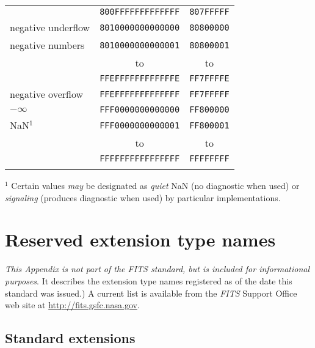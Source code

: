 \documentclass[onecolumn]{aa}
\begin{document}
\begin{table}
\begin{center}
\begin{tabular}{lcc}
                        & {\tt 800FFFFFFFFFFFFF} & {\tt 807FFFFF} \\
    negative underflow  & {\tt 8010000000000000} & {\tt 80800000} \\
    negative numbers    & {\tt 8010000000000001} & {\tt 80800001} \\
                        &             to         &         to     \\
                        & {\tt FFEFFFFFFFFFFFFE} & {\tt FF7FFFFE} \\
    negative overflow   & {\tt FFEFFFFFFFFFFFFF} & {\tt FF7FFFFF} \\
    $-\infty$           & {\tt FFF0000000000000} & {\tt FF800000} \\
    NaN$^{1}$           & {\tt FFF0000000000001} & {\tt FF800001} \\
                        &             to         &         to     \\
                        & {\tt FFFFFFFFFFFFFFFF} & {\tt FFFFFFFF} \\
                        &                                         \\ 
\hline
\end{tabular}
\end{center}
$^1$ Certain values {\em may} be designated as  {\em quiet} NaN (no diagnostic
when used)  or {\em signaling} (produces diagnostic when used) by
particular implementations. 

\label{t:ieee}
\end{table}
 

\ifonecol
\else
\twocolumn
\fi


\section{Reserved extension type names}
\label{s:resname}   
{\em This Appendix is not part of the {\em FITS\/} standard, 
but  is included for
informational purposes}.  It describes the
extension type names registered as of the date this standard was
issued.)  A current list is available from the 
{\em FITS\/} Support Office web site at 
\url{http://fits.gsfc.nasa.gov}.

\subsection{Standard extensions}
\end{document}
